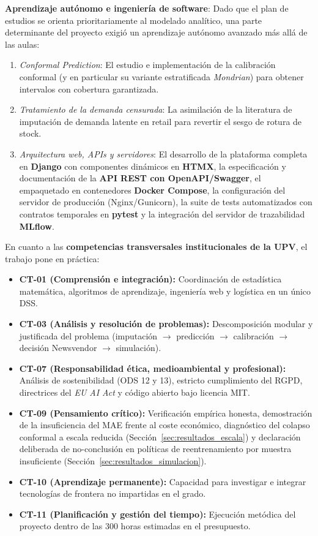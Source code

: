 \textbf{Aprendizaje autónomo e ingeniería de software}: Dado que el plan de estudios se orienta prioritariamente al modelado analítico, una parte determinante del proyecto exigió un aprendizaje autónomo avanzado más allá de las aulas:
\begin{enumerate}
    \item \textit{Conformal Prediction}: El estudio e implementación de la calibración conformal (y en particular su variante estratificada \textit{Mondrian}) para obtener intervalos con cobertura garantizada.
    \item \textit{Tratamiento de la demanda censurada}: La asimilación de la literatura de imputación de demanda latente en retail para revertir el sesgo de rotura de stock.
    \item \textit{Arquitectura web, APIs y servidores}: El desarrollo de la plataforma completa en \textbf{Django} con componentes dinámicos en \textbf{HTMX}, la especificación y documentación de la \textbf{API REST con OpenAPI/Swagger}, el empaquetado en contenedores \textbf{Docker Compose}, la configuración del servidor de producción (Nginx/Gunicorn), la suite de tests automatizados con contratos temporales en \textbf{pytest} y la integración del servidor de trazabilidad \textbf{MLflow}.
\end{enumerate}

En cuanto a las \textbf{competencias transversales institucionales de la UPV}, el trabajo pone en práctica:
\begin{itemize}
    \item \textbf{CT-01 (Comprensión e integración):} Coordinación de estadística matemática, algoritmos de aprendizaje, ingeniería web y logística en un único DSS.
    \item \textbf{CT-03 (Análisis y resolución de problemas):} Descomposición modular y justificada del problema (imputación $\rightarrow$ predicción $\rightarrow$ calibración $\rightarrow$ decisión Newsvendor $\rightarrow$ simulación).
    \item \textbf{CT-07 (Responsabilidad ética, medioambiental y profesional):} Análisis de sostenibilidad (ODS 12 y 13), estricto cumplimiento del RGPD, directrices del \textit{EU AI Act} y código abierto bajo licencia MIT.
    \item \textbf{CT-09 (Pensamiento crítico):} Verificación empírica honesta, demostración de la insuficiencia del MAE frente al coste económico, diagnóstico del colapso conformal a escala reducida (Sección~\ref{sec:resultados_escala}) y declaración deliberada de no-conclusión en políticas de reentrenamiento por muestra insuficiente (Sección~\ref{sec:resultados_simulacion}).
    \item \textbf{CT-10 (Aprendizaje permanente):} Capacidad para investigar e integrar tecnologías de frontera no impartidas en el grado.
    \item \textbf{CT-11 (Planificación y gestión del tiempo):} Ejecución metódica del proyecto dentro de las 300 horas estimadas en el presupuesto.
\end{itemize}

